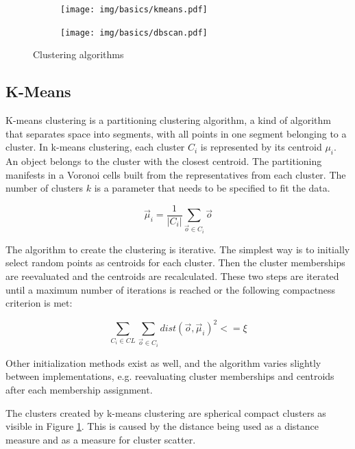 \documentclass[pdftex,12pt,a4paper]{report}
\begin{document}
\begin{figure}[h]
	\centering
	\begin{subfigure}[b]{0.45\textwidth}
		\centering
		\texttt{[image: img/basics/kmeans.pdf]}
		\label{fig:basics-clustering-k-means}
	\end{subfigure}
	\begin{subfigure}[b]{0.45\textwidth}
		\centering
		\texttt{[image: img/basics/dbscan.pdf]}
		\label{fig:basics-clustering-dbscan}
	\end{subfigure}
	\caption{Clustering algorithms}
	\label{fig:basics-clustering}
\end{figure}

\subsection{K-Means}

K-means clustering is a partitioning clustering algorithm, a kind of algorithm that separates space into segments, with all points in one segment belonging to a cluster. In k-means clustering, each cluster $C_i$ is represented by its centroid $\mu_i$. An object belongs to the cluster with the closest centroid. The partitioning manifests in a Voronoi cells built from the representatives from each cluster. The number of clusters $k$ is a parameter that needs to be specified to fit the data.

\begin{equation}
\vec{\mu}_i = \frac{1}{|C_i|} \sum_{\vec{o} \in C_i}\vec{o}
\end{equation}

The algorithm to create the clustering is iterative. The simplest way is to initially select random points as centroids for each cluster. Then the cluster memberships are reevaluated and the centroids are recalculated. These two steps are iterated until a maximum number of iterations is reached or the following compactness criterion is met:

\begin{equation}
\sum\limits_{C_i \in CL} \sum\limits_{\vec{o} \in C_i} dist(\vec{o}, \vec{\mu}_i)^2 <= \xi
\end{equation}

Other initialization methods exist as well, and the algorithm varies slightly between implementations, e.g. reevaluating cluster memberships and centroids after each membership assignment. 

The clusters created by k-means clustering are spherical compact clusters as visible in Figure \ref{fig:basics-clustering-k-means}. This is caused by the distance being used as a distance measure and as a measure for cluster scatter.
\end{document}
